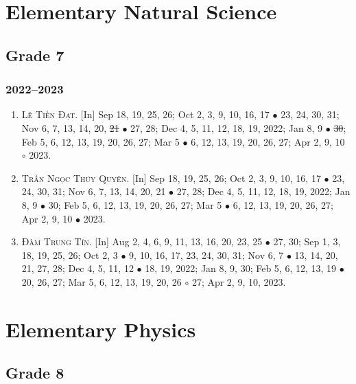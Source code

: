 \documentclass{article}
\begin{document}

\section{Elementary Natural Science}

\subsection{Grade 7}

\subsubsection{2022--2023}

\begin{enumerate}
	\item \textsc{Lê Tiến Đạt.} \textsf{[In]} Sep 18, 19, 25, 26; Oct 2, 3, 9, 10, 16, 17 $\bullet$ 23, 24, 30, 31; Nov 6, 7, 13, 14, 20, \st{21} $\bullet$ 27, 28; Dec 4, 5, 11, 12, 18, 19, 2022; Jan 8, 9 $\bullet$ \st{30}; Feb 5, 6, 12, 13, 19, 20, 26, 27; Mar 5 $\bullet$ 6, 12, 13, 19, 20, 26, 27; Apr 2, 9, 10 $\circ$ 2023.
	\item \textsc{Trần Ngọc Thúy Quyên.} \textsf{[In]} Sep 18, 19, 25, 26; Oct 2, 3, 9, 10, 16, 17 $\bullet$ 23, 24, 30, 31; Nov 6, 7, 13, 14, 20, 21 $\bullet$ 27, 28; Dec 4, 5, 11, 12, 18, 19, 2022; Jan 8, 9 $\bullet$ 30; Feb 5, 6, 12, 13, 19, 20, 26, 27; Mar 5 $\bullet$ 6, 12, 13, 19, 20, 26, 27; Apr 2, 9, 10 $\bullet$ 2023.
	\item \textsc{Đàm Trung Tín.} \textsf{[In]} Aug 2, 4, 6, 9, 11, 13, 16, 20, 23, 25 $\bullet$ 27, 30; Sep 1, 3, 18, 19, 25, 26; Oct 2, 3 $\bullet$ 9, 10, 16, 17, 23, 24, 30, 31; Nov 6, 7 $\bullet$ 13, 14, 20, 21, 27, 28; Dec 4, 5, 11, 12 $\bullet$ 18, 19, 2022; Jan 8, 9, 30; Feb 5, 6, 12, 13, 19 $\bullet$ 20, 26, 27; Mar 5, 6, 12, 13, 19, 20, 26 $\circ$ 27; Apr 2, 9, 10, 2023.
\end{enumerate}


\section{Elementary Physics}

\subsection{Grade 8}
\end{document}
